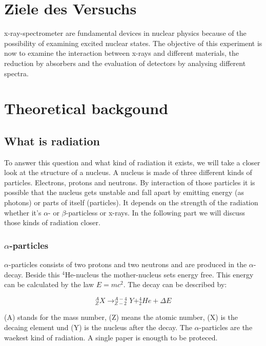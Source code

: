 \section{Ziele des Versuchs}
x-ray-spectrometer are fundamental devices in nuclear physics because of the possibility of examining excited nuclear states. The objective of this experiment is now to examine the interaction between x-rays and different materials, the reduction by absorbers and the evaluation of detectors by analysing different spectra.

\section{Theoretical backgound}

	\subsection{What is radiation}
	To answer this question and what kind of radiation it exists, we will take a closer look at the structure of a nucleus. A nucleus is made of three different kinds of particles. Electrons, protons and neutrons. By interaction of those particles it is possible that the nucleus gets unstable and fall apart by emitting energy (as photons) or parts of itself (particles). It depends on the strength of the radiation whether it's  $\alpha$- or $\beta$-particless or x-rays. In the following part we will discuss those kinds of radiation closer.
\\

	\subsubsection*{$\alpha$-particles}
	$\alpha$-particles consists of two protons and two neutrons and are produced in the $\alpha$-decay. Beside this $^{4}$He-nucleus the mother-nucleus sets energy free. This energy can be calculated by the law $E=mc^{2}$. The decay can be described by:

	\begin{equation}
	^{A}_{Z}X \rightarrow ^{A-4}_{Z-2}Y + ^{4}_{2}He + \Delta E 
	\end{equation}

(A) stands for the mass number, (Z) means the atomic number, (X) is the decaing element und (Y) is the nucleus after the decay. The $\alpha$-particles are the waekest kind of radiation. A single paper is enougth to be proteced.

